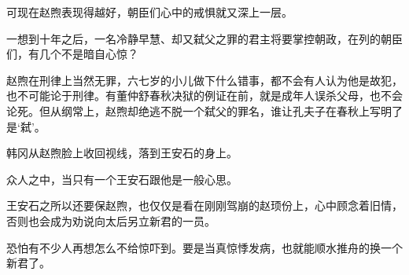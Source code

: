 可现在赵煦表现得越好，朝臣们心中的戒惧就又深上一层。

一想到十年之后，一名冷静早慧、却又弑父之罪的君主将要掌控朝政，在列的朝臣们，有几个不是暗自心惊？

赵煦在刑律上当然无罪，六七岁的小儿做下什么错事，都不会有人认为他是故犯，也不可能论于刑律。有董仲舒春秋决狱的例证在前，就是成年人误杀父母，也不会论死。但从纲常上，赵煦却绝逃不脱一个弑父的罪名，谁让孔夫子在春秋上写明了是‘弑’。

韩冈从赵煦脸上收回视线，落到王安石的身上。

众人之中，当只有一个王安石跟他是一般心思。

王安石之所以还要保赵煦，也仅仅是看在刚刚驾崩的赵顼份上，心中顾念着旧情，否则也会成为劝说向太后另立新君的一员。

恐怕有不少人再想怎么不给惊吓到。要是当真惊悸发病，也就能顺水推舟的换一个新君了。

